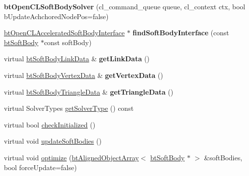 \begin{DoxyCompactItemize}
\item 
\mbox{\label{classbtOpenCLSoftBodySolver_a2f50ffc4b2264bc9017a97dc091ede38}} 
{\bfseries bt\+Open\+C\+L\+Soft\+Body\+Solver} (cl\+\_\+command\+\_\+queue queue, cl\+\_\+context ctx, bool b\+Update\+Achchored\+Node\+Pos=false)
\item 
\mbox{\label{classbtOpenCLSoftBodySolver_a57e630e2c58abfa61baf5263bfd6f8f1}} 
\hyperlink{classbtOpenCLAcceleratedSoftBodyInterface}{bt\+Open\+C\+L\+Accelerated\+Soft\+Body\+Interface} $\ast$ {\bfseries find\+Soft\+Body\+Interface} (const \hyperlink{classbtSoftBody}{bt\+Soft\+Body} $\ast$const soft\+Body)
\item 
\mbox{\label{classbtOpenCLSoftBodySolver_ae22858da3af1adfc9fcc856b64ac6c98}} 
virtual \hyperlink{classbtSoftBodyLinkData}{bt\+Soft\+Body\+Link\+Data} \& {\bfseries get\+Link\+Data} ()
\item 
\mbox{\label{classbtOpenCLSoftBodySolver_a15d45d61a406028903df4a13fed2776c}} 
virtual \hyperlink{classbtSoftBodyVertexData}{bt\+Soft\+Body\+Vertex\+Data} \& {\bfseries get\+Vertex\+Data} ()
\item 
\mbox{\label{classbtOpenCLSoftBodySolver_ae257e21c27a3940491407dc9c23729b1}} 
virtual \hyperlink{classbtSoftBodyTriangleData}{bt\+Soft\+Body\+Triangle\+Data} \& {\bfseries get\+Triangle\+Data} ()
\item 
virtual Solver\+Types \hyperlink{classbtOpenCLSoftBodySolver_a2b643547caacc5c1daedff3f67a140fb}{get\+Solver\+Type} () const
\item 
virtual bool \hyperlink{classbtOpenCLSoftBodySolver_a7cafc88f5845c099ce33fb6c5b84968e}{check\+Initialized} ()
\item 
virtual void \hyperlink{classbtOpenCLSoftBodySolver_ae37f7bd6f4ab0c4b8eb26fb1c104644a}{update\+Soft\+Bodies} ()
\item 
virtual void \hyperlink{classbtOpenCLSoftBodySolver_a1340686f32dcdd4e8f36a56788a2e51c}{optimize} (\hyperlink{classbtAlignedObjectArray}{bt\+Aligned\+Object\+Array}$<$ \hyperlink{classbtSoftBody}{bt\+Soft\+Body} $\ast$ $>$ \&soft\+Bodies, bool force\+Update=false)
\item 

\end{DoxyCompactItemize}
